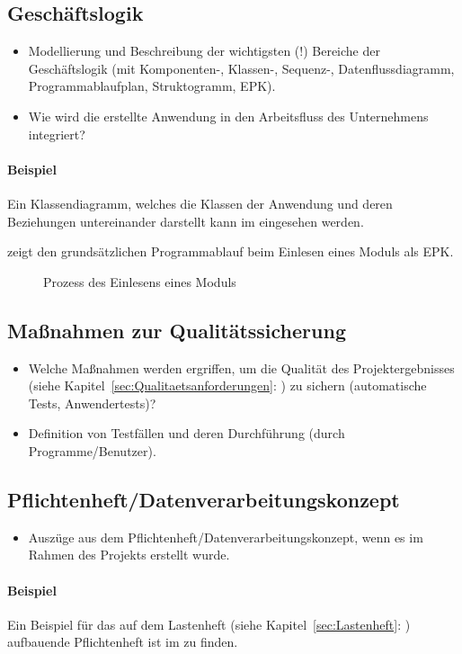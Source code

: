 \subsection{Geschäftslogik}
\label{sec:Geschaeftslogik}

\begin{itemize}
	\item Modellierung und Beschreibung der wichtigsten (!) Bereiche der Geschäftslogik (\zB mit Kom\-po\-nen\-ten-, Klassen-, Sequenz-, Datenflussdiagramm, Programmablaufplan, Struktogramm, \ac{EPK}).
	\item Wie wird die erstellte Anwendung in den Arbeitsfluss des Unternehmens integriert?
\end{itemize}

\paragraph{Beispiel}
Ein Klassendiagramm, welches die Klassen der Anwendung und deren Beziehungen untereinander darstellt kann im  eingesehen werden.

 zeigt den grundsätzlichen Programmablauf beim Einlesen eines Moduls als \ac{EPK}.
\begin{figure}[htb]
\centering
{}
\caption{Prozess des Einlesens eines Moduls}
\label{fig:Modulimport}
\end{figure}


\subsection{Maßnahmen zur Qualitätssicherung}
\label{sec:Qualitaetssicherung}
\begin{itemize}
	\item Welche Maßnahmen werden ergriffen, um die Qualität des Projektergebnisses (siehe Kapitel~\ref{sec:Qualitaetsanforderungen}: ) zu sichern (\zB automatische Tests, Anwendertests)?
	\item \Ggfs Definition von Testfällen und deren Durchführung (durch Programme/Benutzer).
\end{itemize}


\subsection{Pflichtenheft/Datenverarbeitungskonzept}
\label{sec:Pflichtenheft}
\begin{itemize}
	\item Auszüge aus dem Pflichtenheft/Datenverarbeitungskonzept, wenn es im Rahmen des Projekts erstellt wurde.
\end{itemize}

\paragraph{Beispiel}
Ein Beispiel für das auf dem Lastenheft (siehe Kapitel~\ref{sec:Lastenheft}: ) aufbauende Pflichtenheft ist im  zu finden.
